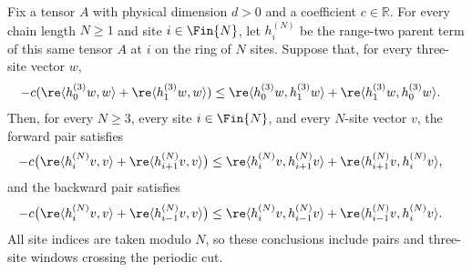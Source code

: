 \begin{lemma}
    \label{thm:three_site_anticommutator_cyclic_transport}
    \leanok
    Fix a tensor $A$ with physical dimension $d>0$ and a coefficient
    $c\in\mathbb R$. For every chain length $N\geq1$ and site
    $i\in\Fin{N}$, let $h_i^{(N)}$ be the range-two parent term of this
    same tensor $A$ at $i$ on the ring of $N$ sites. Suppose that, for
    every three-site vector $w$,
    \begin{align}
        -c(\re\langle h_0^{(3)}w,w\rangle+\re\langle h_1^{(3)}w,w\rangle)
         & \leq
        \re\langle h_0^{(3)}w,h_1^{(3)}w\rangle
        +\re\langle h_1^{(3)}w,h_0^{(3)}w\rangle.
        \label{eq:three_site_anticommutator_transport_hypothesis}
    \end{align}
    Then, for every $N\geq3$, every site $i\in\Fin{N}$, and every $N$-site
    vector $v$, the forward pair satisfies
    \begin{align}
        -c\bigl(\re\langle h_i^{(N)}v,v\rangle
        +\re\langle h_{i+1}^{(N)}v,v\rangle\bigr)
         & \leq \re\langle h_i^{(N)}v,h_{i+1}^{(N)}v\rangle
        +\re\langle h_{i+1}^{(N)}v,h_i^{(N)}v\rangle,
        \label{eq:three_site_anticommutator_transport_forward}
    \end{align}
    and the backward pair satisfies
    \begin{align}
        -c\bigl(\re\langle h_i^{(N)}v,v\rangle
        +\re\langle h_{i-1}^{(N)}v,v\rangle\bigr)
         & \leq \re\langle h_i^{(N)}v,h_{i-1}^{(N)}v\rangle
        +\re\langle h_{i-1}^{(N)}v,h_i^{(N)}v\rangle.
        \label{eq:three_site_anticommutator_transport_backward}
    \end{align}
    All site indices are taken modulo $N$, so these conclusions include pairs
    and three-site windows crossing the periodic cut.
\end{lemma}

